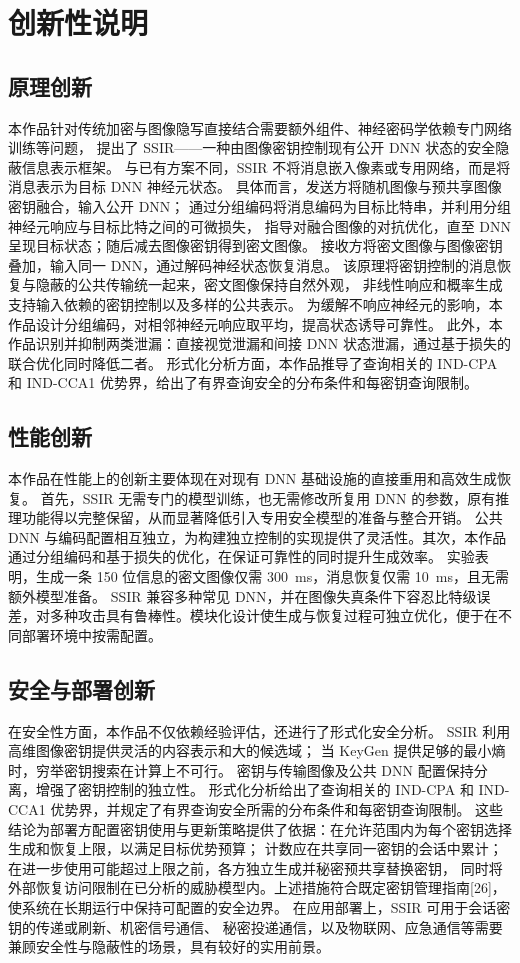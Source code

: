 \chapter{创新性说明}
\section{原理创新}
本作品针对传统加密与图像隐写直接结合需要额外组件、神经密码学依赖专门网络训练等问题，
提出了 SSIR——一种由图像密钥控制现有公开 DNN 状态的安全隐蔽信息表示框架。
与已有方案不同，SSIR 不将消息嵌入像素或专用网络，而是将消息表示为目标 DNN 神经元状态。
具体而言，发送方将随机图像与预共享图像密钥融合，输入公开 DNN；
通过分组编码将消息编码为目标比特串，并利用分组神经元响应与目标比特之间的可微损失，
指导对融合图像的对抗优化，直至 DNN 呈现目标状态；随后减去图像密钥得到密文图像。
接收方将密文图像与图像密钥叠加，输入同一 DNN，通过解码神经状态恢复消息。
该原理将密钥控制的消息恢复与隐蔽的公共传输统一起来，密文图像保持自然外观，
非线性响应和概率生成支持输入依赖的密钥控制以及多样的公共表示。
为缓解不响应神经元的影响，本作品设计分组编码，对相邻神经元响应取平均，提高状态诱导可靠性。
此外，本作品识别并抑制两类泄漏：直接视觉泄漏和间接 DNN 状态泄漏，通过基于损失的联合优化同时降低二者。
形式化分析方面，本作品推导了查询相关的 IND-CPA 和 IND-CCA1 优势界，给出了有界查询安全的分布条件和每密钥查询限制。

\section{性能创新}
本作品在性能上的创新主要体现在对现有 DNN 基础设施的直接重用和高效生成恢复。
首先，SSIR 无需专门的模型训练，也无需修改所复用 DNN 的参数，原有推理功能得以完整保留，从而显著降低引入专用安全模型的准备与整合开销。
公共 DNN 与编码配置相互独立，为构建独立控制的实现提供了灵活性。其次，本作品通过分组编码和基于损失的优化，在保证可靠性的同时提升生成效率。
实验表明，生成一条 150 位信息的密文图像仅需 300~ms，消息恢复仅需 10~ms，且无需额外模型准备。
SSIR 兼容多种常见 DNN，并在图像失真条件下容忍比特级误差，对多种攻击具有鲁棒性。模块化设计使生成与恢复过程可独立优化，便于在不同部署环境中按需配置。

\section{安全与部署创新}
在安全性方面，本作品不仅依赖经验评估，还进行了形式化安全分析。
SSIR 利用高维图像密钥提供灵活的内容表示和大的候选域；
当 KeyGen 提供足够的最小熵时，穷举密钥搜索在计算上不可行。
密钥与传输图像及公共 DNN 配置保持分离，增强了密钥控制的独立性。
形式化分析给出了查询相关的 IND-CPA 和 IND-CCA1 优势界，并规定了有界查询安全所需的分布条件和每密钥查询限制。
这些结论为部署方配置密钥使用与更新策略提供了依据：在允许范围内为每个密钥选择生成和恢复上限，以满足目标优势预算；
计数应在共享同一密钥的会话中累计；在进一步使用可能超过上限之前，各方独立生成并秘密预共享替换密钥，
同时将外部恢复访问限制在已分析的威胁模型内。上述措施符合既定密钥管理指南[26]，使系统在长期运行中保持可配置的安全边界。
在应用部署上，SSIR 可用于会话密钥的传递或刷新、机密信号通信、
秘密投递通信，以及物联网、应急通信等需要兼顾安全性与隐蔽性的场景，具有较好的实用前景。